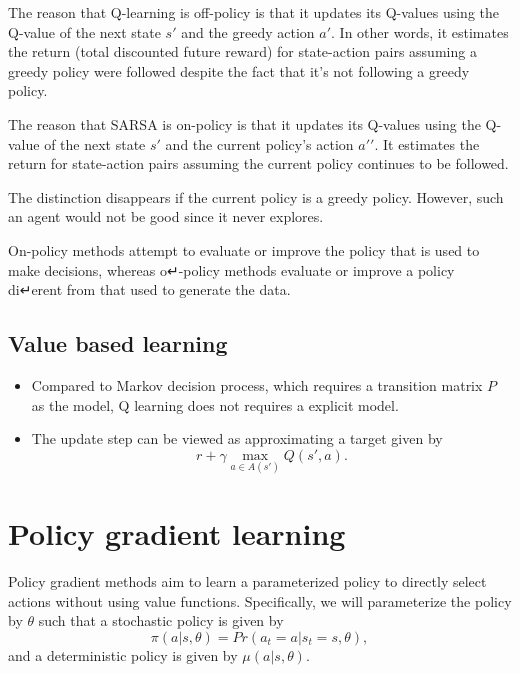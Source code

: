 \begin{refsection}
\begin{remark}
	The reason that Q-learning is off-policy is that it updates its Q-values using the Q-value of the next state $s'$ and the greedy action $a′$. In other words, it estimates the return (total discounted future reward) for state-action pairs assuming a greedy policy were followed despite the fact that it's not following a greedy policy.
	
	The reason that SARSA is on-policy is that it updates its Q-values using the Q-value of the next state $s′$ and the current policy's action $a′′$. It estimates the return for state-action pairs assuming the current policy continues to be followed.
	
	The distinction disappears if the current policy is a greedy policy. However, such an agent would not be good since it never explores.
	
	On-policy methods attempt to evaluate or improve the
	policy that is used to make decisions, whereas o↵-policy methods evaluate or improve
	a policy di↵erent from that used to generate the data.
\end{remark}

\subsection{Value based learning}


\begin{remark}\hfill
	\begin{itemize}
		\item Compared to Markov decision process, which requires a transition matrix $P$ as the model, Q learning does not requires a explicit model.
		\item The update step can be viewed as approximating a target given by
		$$r + \gamma \max_{a\in A(s')} Q(s', a).$$ 
	\end{itemize}
\end{remark}


\section{Policy gradient learning}

Policy gradient methods aim to learn a parameterized policy to directly select actions without using value functions. Specifically, we will parameterize the policy by $\theta$ such that a stochastic policy is given by
$$\pi(a|s, \theta) = Pr(a_t = a| s_t = s, \theta),$$
and a deterministic policy is given by $\mu(a|s,\theta)$.


\end{refsection}
